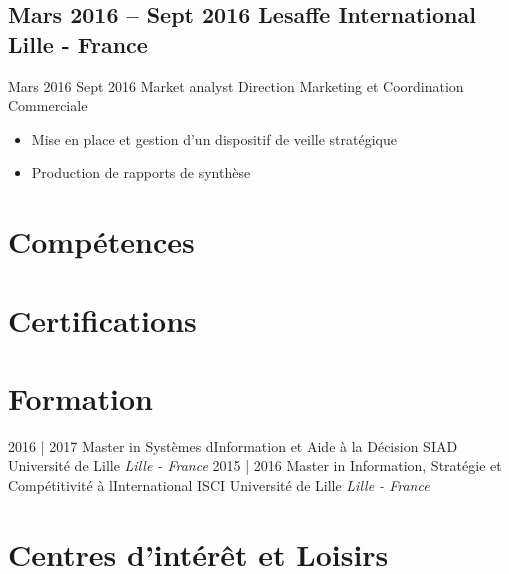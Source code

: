 \documentclass[10pt,legalpaper,oneside,roman]{moderncv}        %
\begin{document}
\subsection{Mars 2016 -- Sept 2016 Lesaffe International Lille - France}	
\cventry
{Mars 2016 Sept 2016}
{Market analyst}
{Direction Marketing et Coordination Commerciale}
{}
{}
{\begin{itemize}%
	\item Mise en place et gestion d'un dispositif de veille stratégique
	\item Production de rapports de synthèse
	\end{itemize}}	
\section{Compétences}
\cvline{}{}
\section{Certifications}
\section{Formation}
\cventry
{2016 | 2017}
{Master in Systèmes d\textquotesingle{}Information et Aide à la Décision SIAD}
{Université de Lille}
{}
{\textit{Lille - France}}
{}
\cventry
{2015 | 2016}
{Master in Information, Stratégie et Compétitivité à l\textquotesingle{}International ISCI}
{Université de Lille}
{}
{\textit{Lille - France}}
{}
\section{Centres d’intérêt et Loisirs}




\ 
\end{document}
